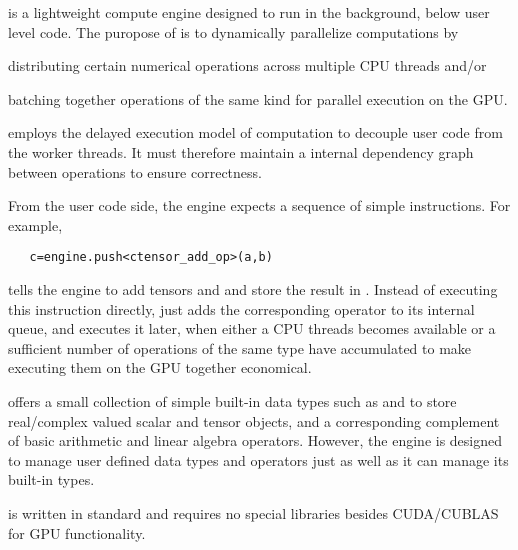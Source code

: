 \Cengine{} is a lightweight compute engine designed to run in the background, below user level \cpp{} code.  
The puropose of \Cengine{} is to dynamically parallelize computations by  
\begin{compactenum}[~~(a)]
\item distributing certain numerical operations across multiple CPU threads and/or  
\item batching together operations of the same kind for parallel execution on the GPU. 
\end{compactenum}
\Cengine{} employs the delayed execution model of computation to decouple user code %
from the worker threads. 
It must therefore maintain a internal dependency graph between operations   
to ensure correctness. %

From the user code side, the engine expects a sequence of simple instructions. For example, 

\texttt{~~~c=engine.push<ctensor\_add\_op>(a,b)}

tells the engine to add tensors  and  and store the result in . 
Instead of executing this instruction directly, 
\Cengine{} just adds the corresponding  operator to its internal queue, 
and executes it later, when either a CPU threads becomes 
available or a sufficient number of operations of the same type have accumulated to 
make executing them on the GPU together economical. 

\Cengine{} offers a small collection of simple built-in data types such as  and  
to store real/complex valued scalar and tensor objects, and a corresponding complement of 
basic arithmetic and linear algebra operators. 
However, the engine is designed to manage user defined data types and 
operators just as well as it can manage its built-in types. 

\Cengine{} is written in standard \cppe{} and requires no special libraries besides CUDA/CUBLAS 
for GPU functionality.  

